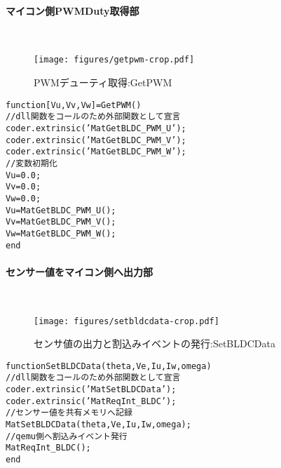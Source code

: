 \paragraph{マイコン側PWMDuty取得部}\mbox{}\\
\begin{figure}[htbp!]
\begin{center}
    \texttt{[image: figures/getpwm-crop.pdf]}
\end{center}
\caption{PWMデューティ取得:GetPWM}
\label{getpwm}
\end{figure}
{\small
\begin{alltt}
function [Vu,Vv,Vw] = GetPWM()
    //dll関数をコールのため外部関数として宣言
    coder.extrinsic('MatGetBLDC_PWM_U');
    coder.extrinsic('MatGetBLDC_PWM_V');
    coder.extrinsic('MatGetBLDC_PWM_W');
    //変数初期化
    Vu = 0.0;
    Vv = 0.0;
    Vw = 0.0;
    Vu = MatGetBLDC_PWM_U();
    Vv = MatGetBLDC_PWM_V();
    Vw = MatGetBLDC_PWM_W();
end
\end{alltt}
}
\newpage
\paragraph{センサー値をマイコン側へ出力部}\mbox{}\\
\begin{figure}[htbp!]
\begin{center}
    \texttt{[image: figures/setbldcdata-crop.pdf]}
\end{center}
\caption{センサ値の出力と割込みイベントの発行:SetBLDCData}
\label{setbldcdata}
\end{figure}
{\small
\begin{alltt}
function SetBLDCData(theta, Ve, Iu, Iw, omega)
    //dll関数をコールのため外部関数として宣言
    coder.extrinsic('MatSetBLDCData');
    coder.extrinsic('MatReqInt_BLDC');
    //センサー値を共有メモリへ記録
    MatSetBLDCData(theta, Ve, Iu, Iw, omega);
    //qemu側へ割込みイベント発行
    MatReqInt_BLDC();
end
\end{alltt}
}

